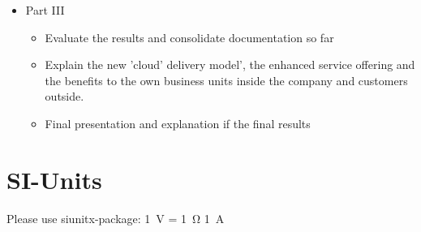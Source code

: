 \begin{itemize}
\begin{itemize}
    \end{itemize}
\item Part III 
\begin{itemize}
    \item Evaluate the results and consolidate documentation so far  
    \item Explain the new 'cloud' delivery model', the enhanced service offering and the benefits to the own business units inside the company and customers outside.   
    \item Final presentation and explanation if the final results
    \end{itemize}
\end{itemize}






\section{SI-Units}

Please use siunitx-package:
\SI{1}{\volt} = \SI{1}{\ohm} \SI{1}{\ampere}


